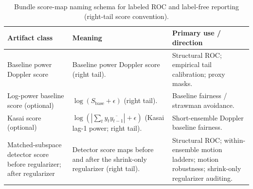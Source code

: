 \begin{table}[t]
\centering
\small
\begingroup
\setlength{\tabcolsep}{4pt}
\begin{tabular}{@{}P{4.1cm} P{6.8cm} P{4.4cm}@{}}
\hline
Artifact class & Meaning & Primary use / direction \\
\hline
Baseline power Doppler score & Baseline power Doppler score (right tail). & Structural ROC; empirical tail calibration; proxy masks. \\
Log-power baseline score (optional) & $\log(S_{\mathrm{base}}+\epsilon)$ (right tail). & Baseline fairness / strawman avoidance. \\
Kasai score (optional) & $\log(|\sum_t y_t\overline{y_{t-1}}|+\epsilon)$ (Kasai lag-1 power; right tail). & Short-ensemble Doppler baseline fairness. \\
Matched-subspace detector score before regularizer; after regularizer & Detector score maps before and after the shrink-only regularizer (right tail). & Structural ROC; within-ensemble motion ladders; motion robustness; shrink-only regularizer auditing. \\
\hline
\end{tabular}
\endgroup
\caption{Bundle score-map naming schema for labeled ROC and label-free reporting (right-tail score convention).}
\label{tab:score_vnext_bundle_schema}
\end{table}

